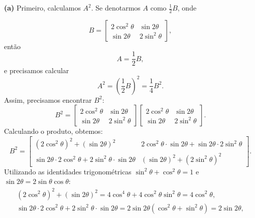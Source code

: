 \begin{resolution}
  {\bf (a)} Primeiro, calculamos \( A^2 \). Se denotarmos \( A \) como \( \frac{1}{2} B \), onde

  \begin{equation}
    B = \begin{bmatrix}
      2\cos^2\theta & \sin 2\theta  \\
      \sin 2\theta  & 2\sin^2\theta
    \end{bmatrix},
  \end{equation}
  então
  \begin{equation}
    A = \frac{1}{2} B,
  \end{equation}
  e precisamos calcular
  \begin{equation}
    A^2 = \left(\frac{1}{2} B\right)^2 = \frac{1}{4} B^2.
  \end{equation}
  Assim, precisamos encontrar \( B^2 \):
  \begin{equation}
    B^2 = \begin{bmatrix}
      2\cos^2\theta & \sin 2\theta  \\
      \sin 2\theta  & 2\sin^2\theta
    \end{bmatrix}
    \begin{bmatrix}
      2\cos^2\theta & \sin 2\theta  \\
      \sin 2\theta  & 2\sin^2\theta
    \end{bmatrix}.
  \end{equation}
  Calculando o produto, obtemos:
  \begin{equation}
    B^2 = \begin{bmatrix}
      (2\cos^2\theta)^2 + (\sin 2\theta)^2                                & 2\cos^2\theta \cdot \sin 2\theta + \sin 2\theta \cdot 2\sin^2\theta \\
      \sin 2\theta \cdot 2\cos^2\theta + 2\sin^2\theta \cdot \sin 2\theta & (\sin 2\theta)^2 + (2\sin^2\theta)^2
    \end{bmatrix}.
  \end{equation}
  Utilizando as identidades trigonométricas \( \sin^2\theta + \cos^2\theta = 1 \) e \( \sin 2\theta = 2 \sin \theta \cos \theta \):
  \begin{gather}
    (2\cos^2\theta)^2 + (\sin 2\theta)^2 = 4 \cos^4\theta + 4 \cos^2\theta \sin^2\theta = 4 \cos^2\theta, \\
    \sin 2\theta \cdot 2\cos^2\theta + 2\sin^2\theta \cdot \sin 2\theta = 2 \sin 2\theta (\cos^2\theta + \sin^2\theta) = 2 \sin 2\theta, \\

\end{gather}
\end{resolution}
